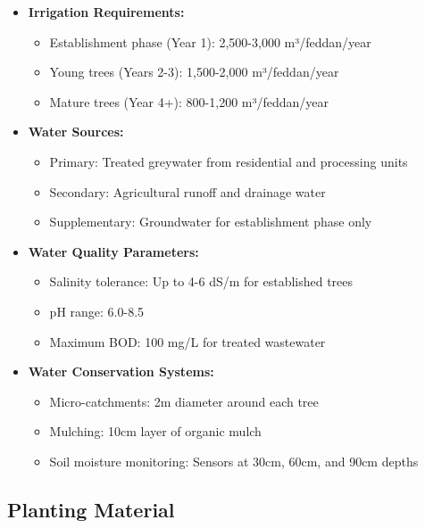 \begin{itemize}
    \item \textbf{Irrigation Requirements:}
    \begin{itemize}
        \item Establishment phase (Year 1): 2,500-3,000 m³/feddan/year
        \item Young trees (Years 2-3): 1,500-2,000 m³/feddan/year
        \item Mature trees (Year 4+): 800-1,200 m³/feddan/year
    \end{itemize}
    \item \textbf{Water Sources:}
    \begin{itemize}
        \item Primary: Treated greywater from residential and processing units
        \item Secondary: Agricultural runoff and drainage water
        \item Supplementary: Groundwater for establishment phase only
    \end{itemize}
    \item \textbf{Water Quality Parameters:}
    \begin{itemize}
        \item Salinity tolerance: Up to 4-6 dS/m for established trees
        \item pH range: 6.0-8.5
        \item Maximum BOD: 100 mg/L for treated wastewater
    \end{itemize}
    \item \textbf{Water Conservation Systems:}
    \begin{itemize}
        \item Micro-catchments: 2m diameter around each tree
        \item Mulching: 10cm layer of organic mulch
        \item Soil moisture monitoring: Sensors at 30cm, 60cm, and 90cm depths
    \end{itemize}
\end{itemize}

\subsection{Planting Material}

